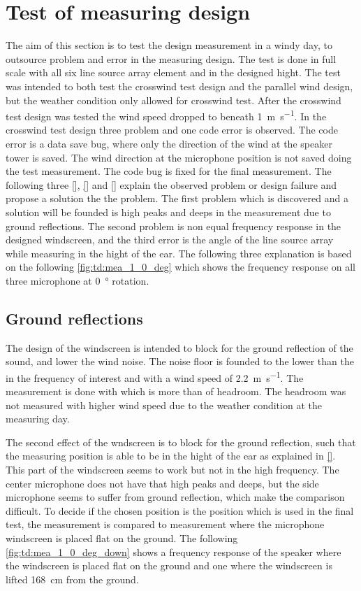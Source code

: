 \section{Test of measuring design}
The aim of this section is to test the design measurement in a windy day, to outsource problem and error in the measuring design. The test is done in full scale with all six line source array element and in the designed hight. The test was intended to both test the crosswind test design and the parallel wind design, but the weather condition only allowed for crosswind test. After the crosswind test design was tested the wind speed dropped to beneath \SI{1}{\meter\per\second}.
In the crosswind test design three problem and one code error is observed. The code error is a data save bug, where only the direction of the wind at the speaker tower is saved. The wind direction at the microphone position is not saved doing the test measurement. The code bug is fixed for the final measurement. The following three \autoref{}, \autoref{} and \autoref{} explain the observed problem or design failure and propose a solution the the problem. The first problem which is discovered and a solution will be founded is high peaks and deeps in the measurement due to ground reflections. The second problem is non equal frequency response in the designed windscreen, and the third error is the angle of the line source array while measuring in the hight of the ear.  The following three explanation is based on the following \autoref{fig:td:mea_1_0_deg} which shows the frequency response on all three microphone at \SI{0}{\degree} rotation.



\subsection{Ground reflections}
The design of the windscreen is intended to block for the ground reflection of the sound, and lower the wind noise. The noise floor is founded to the lower than the  in the frequency of interest and with a wind speed of \SI{2.2}{\meter\per\second}. The measurement is done with  which is more than  of headroom. The headroom was not measured with higher wind speed due to the weather condition at the measuring day. 

The second effect of the wndscreen is to block for the ground reflection, such that the measuring position is able to be in the hight of the ear as explained in \autoref{}. This part of the windscreen seems to work but not in the high frequency. The center microphone does not have that high peaks and deeps, but the side microphone seems to suffer from ground reflection, which make the comparison difficult. To decide if the chosen position is the position which is used in the final test, the measurement is compared to measurement where the microphone windscreen is placed flat on the ground. The following \autoref{fig:td:mea_1_0_deg_down} shows a frequency response of the speaker where the windscreen is placed flat on the ground and one where the windscreen is lifted \SI{168}{\centi\meter} from the ground.  

